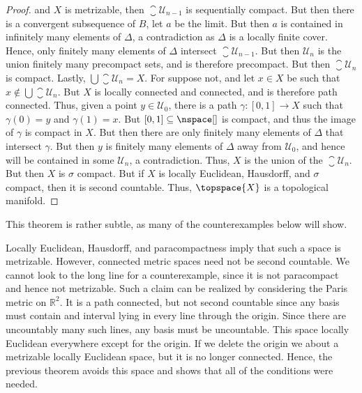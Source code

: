 \documentclass{article}                                                        %
\begin{document}
\begin{proof}
                and $X$ is metrizable, then $\closure{\mathcal{U}_{n-1}}$
                is sequentially compact. But then there is a convergent
                subsequence of $B$, let $a$ be the limit. But then $a$ is
                contained in infinitely many elements of $\Delta$, a
                contradiction as $\Delta$ is a locally finite cover. Hence,
                only finitely many elements of $\Delta$ intersect
                $\closure{\mathcal{U}_{n-1}}$. But then
                $\mathcal{U}_{n}$ is the union finitely many precompact sets,
                and is therefore precompact. But then
                $\closure{\mathcal{U}_{n}}$ is compact. Lastly,
                $\bigcup\closure{\mathcal{U}_{n}}=X$. For suppose not, and let
                $x\in{X}$ be such that
                $x\notin\bigcup\closure{\mathcal{U}_{n}}$. But $X$ is locally
                connected and connected, and is therefore path connected. Thus,
                given a point $y\in\mathcal{U}_{0}$, there is a path
                $\gamma:[0,1]\rightarrow{X}$ such that $\gamma(0)=y$ and
                $\gamma(1)=x$. But $[0,1]\subseteq\nspace[]$ is compact, and
                thus the image of $\gamma$ is compact in $X$. But then there are
                only finitely many elements of $\Delta$ that intersect
                $\gamma$. But then $y$ is finitely many elements of $\Delta$
                away from $\mathcal{U}_{0}$, and hence will be contained in
                some $\mathcal{U}_{n}$, a contradiction. Thus, $X$ is the union
                of the $\closure{\mathcal{U}_{n}}$. But then $X$ is
                $\sigma$ compact. But if $X$ is locally Euclidean, Hausdorff,
                and $\sigma$ compact, then it is second countable. Thus,
                $\topspace{X}$ is a topological manifold.
            \end{proof}
            This theorem is rather subtle, as many of the counterexamples below
            will show.
            \begin{example}
                Locally Euclidean, Hausdorff, and paracompactness imply that
                such a space is metrizable. However, connected metric spaces
                need not be second countable. We cannot look to the long line
                for a counterexample, since it is not paracompact and hence not
                metrizable. Such a claim can be realized by considering the
                Paris metric on $\mathbb{R}^{2}$. It is a path connected,
                but not second countable since any basis must contain and
                interval lying in every line through the origin. Since there are
                uncountably many such lines, any basis must be uncountable. This
                space locally Euclidean everywhere except for the origin. If we
                delete the origin we about a metrizable locally Euclidean space,
                but it is no longer connected. Hence, the previous theorem
                avoids this space and shows that all of the conditions were
                needed.
            \end{example}
\end{document}
